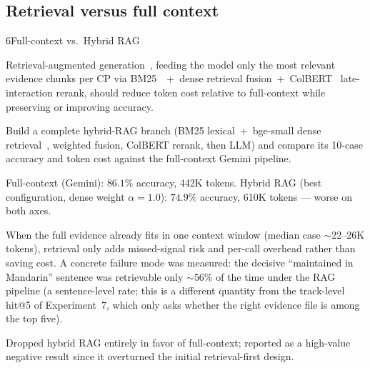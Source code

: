 \subsection{Retrieval versus full context}

\begin{explog}{6}{Full-context vs.\ Hybrid RAG}
\item[Hypothesis] Retrieval-augmented generation~\cite{lewis2020rag}, feeding the model only the most relevant evidence chunks per CP via BM25~\cite{robertson2009bm25}~+~dense retrieval fusion~+~ColBERT~\cite{khattab2020colbert} late-interaction rerank, should reduce token cost relative to full-context while preserving or improving accuracy.
\item[Method] Build a complete hybrid-RAG branch (BM25 lexical~+~bge-small dense retrieval~\cite{xiao2024bge}, weighted fusion, ColBERT rerank, then LLM) and compare its 10-case accuracy and token cost against the full-context Gemini pipeline.
\item[Result] Full-context (Gemini): $86.1\%$ accuracy, 442K tokens. Hybrid RAG (best configuration, dense weight $\alpha=1.0$): $74.9\%$ accuracy, 610K tokens --- worse on both axes.
\item[Inference] When the full evidence already fits in one context window (median case $\sim$22--26K tokens), retrieval only adds missed-signal risk and per-call overhead rather than saving cost. A concrete failure mode was measured: the decisive ``maintained in Mandarin'' sentence was retrievable only $\sim$56\% of the time under the RAG pipeline (a sentence-level rate; this is a different quantity from the track-level hit@5 of Experiment~7, which only asks whether the right evidence file is among the top five).
\item[Verdict] Dropped hybrid RAG entirely in favor of full-context; reported as a high-value negative result since it overturned the initial retrieval-first design.
\end{explog}


